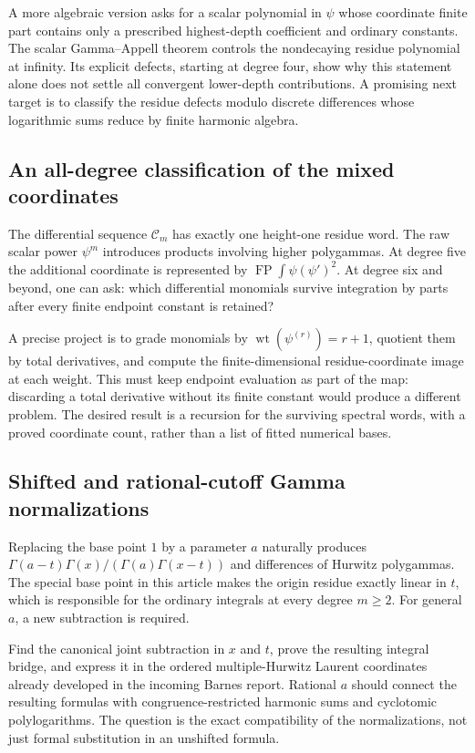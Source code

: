 \documentclass[11pt,a4paper]{article}
\numberwithin{equation}{section}
\theoremstyle{definition}
\DeclareMathOperator{\FP}{FP}
\newcommand{\CM}{\mathcal C}
\begin{document}
A more algebraic version asks for a scalar polynomial in $\psi$
whose coordinate finite part contains only a prescribed highest-depth
coefficient and ordinary constants. The scalar Gamma--Appell theorem
controls the nondecaying residue polynomial at infinity. Its explicit
defects, starting at degree four, show why this statement alone does
not settle all convergent lower-depth contributions. A promising
next target is to classify the residue defects modulo discrete
differences whose logarithmic sums reduce by finite harmonic algebra.

\subsection{An all-degree classification of the mixed coordinates}

The differential sequence $\CM_m$ has exactly one height-one residue
word. The raw scalar power $\psi^m$ introduces products involving
higher polygammas. At degree five the additional coordinate is represented
by $\FP\int\psi(\psi')^2$. At degree six and beyond, one can ask:
which differential monomials survive integration by parts after every
finite endpoint constant is retained?

A precise project is to grade monomials by
$\operatorname{wt}(\psi^{(r)})=r+1$, quotient them by total
derivatives, and compute the finite-dimensional residue-coordinate
image at each weight. This must keep endpoint evaluation as part of
the map: discarding a total derivative without its finite constant
would produce a different problem. The desired result is a recursion
for the surviving spectral words, with a proved coordinate count,
rather than a list of fitted numerical bases.

\subsection{Shifted and rational-cutoff Gamma normalizations}

Replacing the base point $1$ by a parameter $a$ naturally produces
$\Gamma(a-t)\Gamma(x)/(\Gamma(a)\Gamma(x-t))$ and differences
of Hurwitz polygammas. The special base point in this article makes
the origin residue exactly linear in $t$, which is responsible for
the ordinary integrals at every degree $m\ge2$. For general $a$, a
new subtraction is required.

Find the canonical joint subtraction in $x$ and $t$, prove the
resulting integral bridge, and express it in the ordered
multiple-Hurwitz Laurent coordinates already developed in the
incoming Barnes report. Rational $a$ should connect the resulting
formulas with congruence-restricted harmonic sums and cyclotomic
polylogarithms. The question is the exact compatibility of the
normalizations, not just formal substitution in an unshifted formula.
\end{document}
